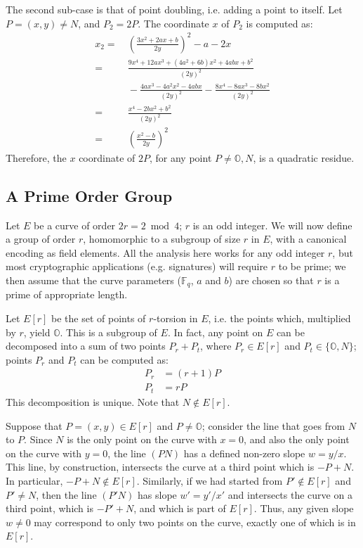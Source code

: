 \documentclass{llncs}
\newcommand{\bF}{\mathbb{F}}
\newcommand{\neutral}{\mathbb{O}}
\begin{document}
The second sub-case is that of point doubling, i.e. adding a point to
itself. Let $P = (x, y) \neq N$, and $P_2 = 2P$. The coordinate $x$
of $P_2$ is computed as:
\begin{align*}
    x_2 =&\ \left(\frac{3x^2 + 2ax + b}{2y}\right)^2 - a - 2x \\
    =&\ \frac{9x^4 + 12ax^3 + (4a^2+6b)x^2 + 4abx + b^2}{(2y)^2} \\
     &\  - \frac{4ax^3 - 4a^2x^2 - 4abx}{(2y)^2}
        - \frac{8x^4 - 8ax^3 - 8bx^2}{(2y)^2} \\
    =&\ \frac{x^4 - 2bx^2 + b^2}{(2y)^2} \\
    =&\ \left(\frac{x^2-b}{2y}\right)^2
\end{align*}
Therefore, the $x$ coordinate of $2P$, for any point $P \neq \neutral,N$,
is a quadratic residue.

\subsection{A Prime Order Group}\label{sec:structure:groupdef}

Let $E$ be a curve of order $2r = 2 \bmod 4$; $r$ is an odd integer. We
will now define a group of order $r$, homomorphic to a subgroup of size
$r$ in $E$, with a canonical encoding as field elements. All the
analysis here works for any odd integer $r$, but most cryptographic
applications (e.g. signatures) will require $r$ to be prime; we then
assume that the curve parameters ($\bF_q$, $a$ and $b$) are chosen so
that $r$ is a prime of appropriate length.

Let $E[r]$ be the set of points of $r$-torsion in $E$, i.e. the points
which, multiplied by $r$, yield $\neutral$. This is a subgroup of $E$.
In fact, any point on $E$ can be decomposed into a sum of two
points $P_r + P_t$, where $P_r \in E[r]$ and $P_t \in \{ \neutral, N \}$;
points $P_r$ and $P_t$ can be computed as:
\begin{align*}
    P_r &= (r + 1)P \\
    P_t &= rP
\end{align*}
This decomposition is unique. Note that $N \notin E[r]$.

Suppose that $P = (x, y) \in E[r]$ and $P \neq \neutral$; consider the
line that goes from $N$ to $P$. Since $N$ is the only point on the curve
with $x = 0$, and also the only point on the curve with $y = 0$, the
line $(PN)$ has a defined non-zero slope $w = y/x$. This line, by
construction, intersects the curve at a third point which is $-P+N$. In
particular, $-P+N \notin E[r]$. Similarly, if we had started from $P'
\notin E[r]$ and $P' \neq N$, then the line $(P'N)$ has slope $w' =
y'/x'$ and intersects the curve on a third point, which is $-P'+N$, and
which is part of $E[r]$. Thus, any given slope $w\neq 0$ may correspond
to only two points on the curve, exactly one of which is in $E[r]$.
\end{document}
